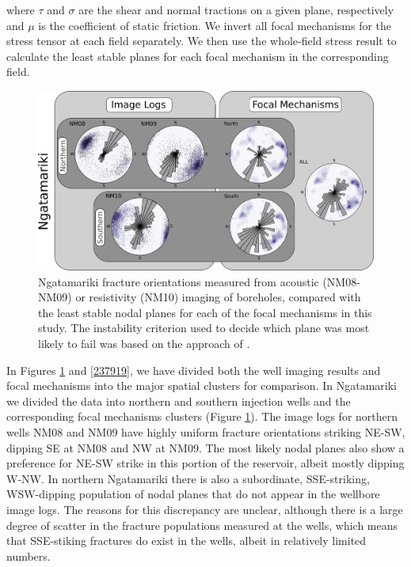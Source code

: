 where $\tau$ and $\sigma$ are the shear and normal tractions on a given plane, respectively and $\mu$ is the coefficient of static friction. We invert all focal mechanisms for the stress tensor at each field separately. We then use the whole-field stress result to calculate the least stable planes for each focal mechanism in the corresponding field.

\begin{figure}
\begin{center}
\includegraphics[width=\textwidth,height=\textheight,keepaspectratio]{Chapter_5_FMs/figures/Nga_fracture_FM/ALL_fracs_and_FMs_Ngatamariki}
\caption[Ngatamariki fracture orientations and focal mechanism nodal planes]{{
Ngatamariki fracture orientations measured from acoustic (NM08-NM09) or resistivity (NM10) imaging of boreholes, compared with the least stable nodal planes for each of the focal mechanisms in this study. The instability criterion used to decide which plane was most likely to fail was based on the approach of \citet{vavryvcuk2014iterative}.
{\label{237918}}%
}}
\end{center}
\end{figure}

In Figures \ref{237918} and \ref{237919}, we have divided both the well imaging results and focal mechanisms into the major spatial clusters for comparison. In Ngatamariki we divided the data into northern and southern injection wells and the corresponding focal mechanisms clusters (Figure \ref{237918}). The image logs for northern wells NM08 and NM09 have highly uniform fracture orientations striking NE-SW, dipping SE at NM08 and NW at NM09. The most likely nodal planes also show a preference for NE-SW strike in this portion of the reservoir, albeit mostly dipping W-NW. In northern Ngatamariki there is also a subordinate, SSE-striking, WSW-dipping population of nodal planes that do not appear in the wellbore image logs. The reasons for this discrepancy are unclear, although there is a large degree of scatter in the fracture populations measured at the wells, which means that SSE-stiking fractures do exist in the wells, albeit in relatively limited numbers.

